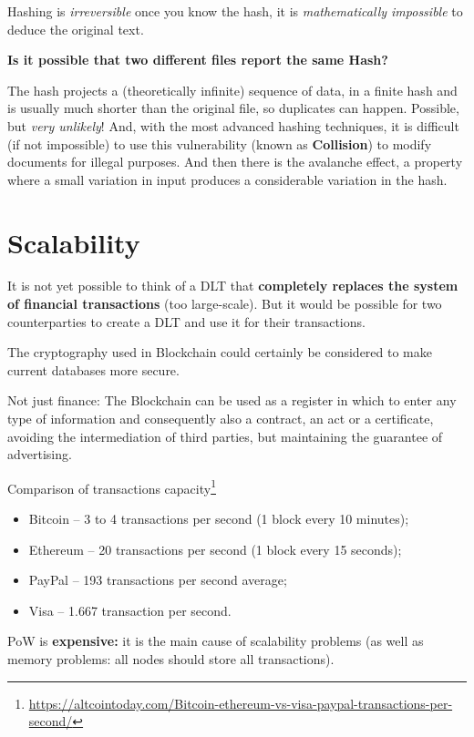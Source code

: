 Hashing is \textit{irreversible} once you know the hash, it is \textit{mathematically impossible} to deduce the original text.

\textbf{Is it possible that two different files report the same Hash?}

The hash projects a (theoretically infinite) sequence of data, in a finite hash and is usually much shorter than the original file, so duplicates can happen. Possible, but \textit{very unlikely}! And, with the most advanced hashing techniques, it is difficult (if not impossible) to use this vulnerability (known as \textbf{Collision}) to modify documents for illegal purposes. And then there is the avalanche effect, a property where a small variation in input produces a considerable variation in the hash.

\section{Scalability}

It is not yet possible to think of a DLT that \textbf{completely replaces the system of financial transactions} (too large-scale). But it would be possible for two counterparties to create a DLT and use it for their transactions.

The cryptography used in Blockchain could certainly be considered to make current databases more secure.

Not just finance: The Blockchain can be used as a register in which to enter any type of information and consequently also a contract, an act or a certificate, avoiding the intermediation of third parties, but maintaining the guarantee of advertising.

Comparison of transactions capacity\footnote{\url{https://altcointoday.com/Bitcoin-ethereum-vs-visa-paypal-transactions-per-second/}}
\begin{itemize}
	\item Bitcoin – 3 to 4 transactions per second (1 block every 10 minutes);
	\item Ethereum – 20 transactions per second (1 block every 15 seconds);
	\item PayPal – 193 transactions per second average;
	\item Visa – 1.667 transaction per second.
\end{itemize}

PoW is \textbf{expensive:} it is the main cause of scalability problems (as well as memory problems: all nodes should store all transactions).

